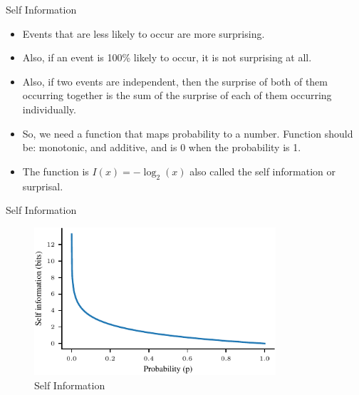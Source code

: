 \documentclass[handout]{beamer}
\begin{document}
\begin{frame}{Self Information}
    \begin{itemize}
        \item Events that are less likely to occur are more surprising.
        \item Also, if an event is 100\% likely to occur, it is not surprising at all.
        \item Also, if two events are independent, then the surprise of both of them occurring together is the sum of the surprise of each of them occurring individually.
        \item So, we need a function that maps probability to a number. Function  should be: monotonic, and additive, and is 0 when the probability is 1.
        \item The function is $I(x) = -\log_2(x)$ also called the self information or surprisal.
    \end{itemize}
    \end{frame}

\begin{frame}{Self Information}
    \begin{figure}
        \centering
        \includegraphics[width=0.8\textwidth]{notebooks/figures/information-theory/self-information.pdf}
        \caption{Self Information}
        \label{fig:self_info}
    \end{figure}
\end{frame}
\end{document}
